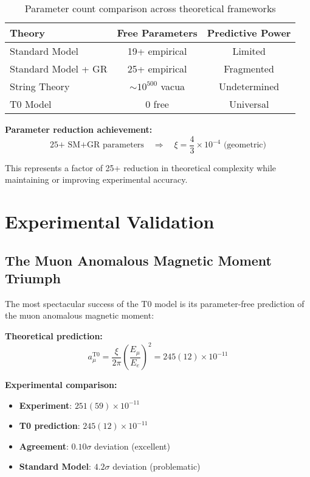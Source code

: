 \documentclass[12pt,a4paper]{report}
\begin{document}
\begin{table}[htbp]
	\centering
	\begin{tabular}{lcc}
		\toprule
		\textbf{Theory} & \textbf{Free Parameters} & \textbf{Predictive Power} \\
		\midrule
		Standard Model & 19+ empirical & Limited \\
		Standard Model + GR & 25+ empirical & Fragmented \\
		String Theory & $\sim 10^{500}$ vacua & Undetermined \\
		T0 Model & 0 free & Universal \\
		\bottomrule
	\end{tabular}
	\caption{Parameter count comparison across theoretical frameworks}
	\label{tab:parameter_comparison}
\end{table}

\textbf{Parameter reduction achievement:}
\begin{equation}
	\text{25+ SM+GR parameters} \quad \Rightarrow \quad \xi = \frac{4}{3} \times 10^{-4} \text{ (geometric)}
\end{equation}

This represents a factor of 25+ reduction in theoretical complexity while maintaining or improving experimental accuracy.

\section{Experimental Validation}
\label{sec:experimental_validation}

\subsection{The Muon Anomalous Magnetic Moment Triumph}
\label{subsec:muon_triumph}

The most spectacular success of the T0 model is its parameter-free prediction of the muon anomalous magnetic moment:

\textbf{Theoretical prediction:}
\begin{equation}
	a_\mu^{\text{T0}} = \frac{\xi}{2\pi} \left(\frac{E_\mu}{E_e}\right)^2 = 245(12) \times 10^{-11}
\end{equation}

\textbf{Experimental comparison:}
\begin{itemize}
	\item \textbf{Experiment}: $251(59) \times 10^{-11}$
	\item \textbf{T0 prediction}: $245(12) \times 10^{-11}$
	\item \textbf{Agreement}: $0.10\sigma$ deviation (excellent)
	\item \textbf{Standard Model}: $4.2\sigma$ deviation (problematic)
\end{itemize}
\end{document}
